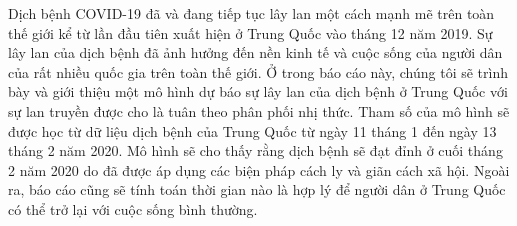 \documentclass[../main.tex]{subfiles}
\begin{document}
Dịch bệnh COVID-19 đã và đang tiếp tục lây lan một cách mạnh mẽ trên toàn thế giới kể từ lần đầu tiên xuất hiện ở Trung Quốc vào tháng 12 năm 2019. Sự lây lan của dịch bệnh đã ảnh hưởng đến nền kinh tế và cuộc sống của người dân của rất nhiều quốc gia trên toàn thế giới. Ở trong báo cáo này, chúng tôi sẽ trình bày và giới thiệu một mô hình dự báo sự lây lan của dịch bệnh ở Trung Quốc với sự lan truyền được cho là tuân theo phân phối nhị thức. Tham số của mô hình sẽ được học từ dữ liệu dịch bệnh của Trung Quốc từ ngày 11 tháng 1 đến ngày 13 tháng 2 năm 2020. Mô hình sẽ cho thấy rằng dịch bệnh sẽ đạt đỉnh ở cuối tháng 2 năm 2020 do đã được áp dụng các biện pháp cách ly và giãn cách xã hội. Ngoài ra, báo cáo cũng sẽ tính toán thời gian nào là hợp lý để người dân ở Trung Quốc có thể trở lại với cuộc sống bình thường.
\end{document}

